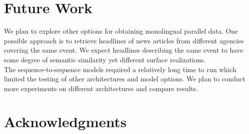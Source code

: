 \documentclass[11pt,letterpaper]{article}
\begin{document}
\section{Future Work}
 We plan to explore other options for obtaining monolingual parallel data. One possible approach is to retrieve headlines of news articles from different agencies covering the same event. We expect headlines describing the same event to have some degree of semantic similarity yet different surface realizations.\\
 The sequence-to-sequence models required a relatively long time to run which limited the testing of other architectures and model options. We plan to conduct more experiments on different architectures and compare results.  





\section*{Acknowledgments}



\end{document}
